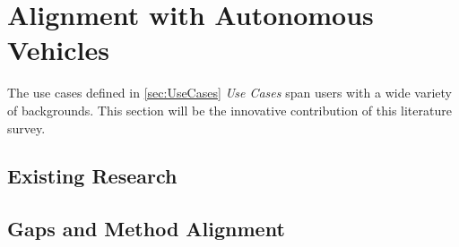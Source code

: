 \section{Alignment with Autonomous Vehicles}\label{sec:Alignment}

The use cases defined in \ref{sec:UseCases} \textit{Use Cases} span users with a wide variety of backgrounds.  This section will be the innovative contribution of this literature survey.

\subsection{Existing Research}



\subsection{Gaps and Method Alignment}



